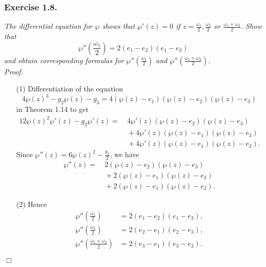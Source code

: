 \documentclass{article}
\begin{document}



\subsubsection*{Exercise 1.8.}
\emph{The differential equation for $\wp$ shows that $\wp'(z) = 0$ if
$z = \frac{\omega_1}{2}, \frac{\omega_2}{2}$ or $\frac{\omega_1+\omega_2}{2}$.
Show that
\[
  \wp''\left( \frac{\omega_1}{2} \right)
  = 2(e_1-e_2)(e_1-e_3)
\]
and obtain corresponding formulas for $\wp''\left( \frac{\omega_2}{2} \right)$ and
$\wp''\left( \frac{\omega_1+\omega_2}{2} \right)$.} \\



\emph{Proof.}
\begin{enumerate}
\item[(1)]
  Differentiation of the equation
  \[
    4 \wp(z)^3 - g_2 \wp(z) - g_3
    = 4 (\wp(z) - e_1)(\wp(z) - e_2)(\wp(z) - e_3)
  \]
  in Theorem 1.14 to get
  \begin{align*}
    12 \wp(z)^2 \wp'(z) - g_2 \wp'(z)
    =&\: 4 \wp'(z) (\wp(z) - e_2)(\wp(z) - e_3) \\
      &\: + 4 \wp'(z) (\wp(z) - e_1)(\wp(z) - e_3) \\
      &\: + 4 \wp'(z) (\wp(z) - e_1)(\wp(z) - e_2).
  \end{align*}
  Since $\wp''(z) = 6 \wp(z)^2 - \frac{g_2}{2}$,
  we have
  \begin{align*}
    \wp''(z)
    =&\: 2 (\wp(z) - e_2)(\wp(z) - e_3) \\
      &\: + 2 (\wp(z) - e_1)(\wp(z) - e_3) \\
      &\: + 2 (\wp(z) - e_1)(\wp(z) - e_2).
  \end{align*}

\item[(2)]
  Hence
  \begin{align*}
    \wp''\left( \frac{\omega_1}{2} \right)
    &= 2(e_1-e_2)(e_1-e_3), \\
    \wp''\left( \frac{\omega_2}{2} \right)
    &= 2(e_2-e_1)(e_2-e_3), \\
    \wp''\left( \frac{\omega_1 + \omega_2}{2} \right)
    &= 2(e_3-e_1)(e_3-e_2).
  \end{align*}
\end{enumerate}
$\Box$ \\\\
\end{document}
